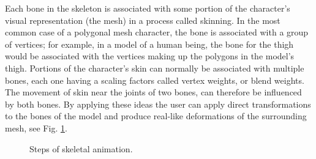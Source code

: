 Each bone in the skeleton is associated with some portion of the character's
visual representation (the mesh) in a process called skinning. In the most
common case of a polygonal mesh character, the bone is associated with a group
of vertices; for example, in a model of a human being, the bone for the
thigh would be associated with the vertices making up the polygons in the
model's thigh. Portions of the character's skin can normally be associated
with multiple bones, each one having a scaling factors called vertex
weights, or blend weights. The movement of skin near the joints of two
bones, can therefore be influenced by both bones. By applying these ideas 
the user can apply direct transformations to the bones of the model and 
produce real-like deformations of the surrounding mesh, see Fig.
\ref{fig:rigged_character}.
\begin{figure}
    \centering
    \qquad
    \qquad
    \caption{Steps of skeletal animation.}
    \label{fig:rigged_character}
\end{figure}
